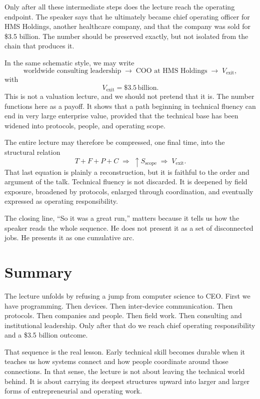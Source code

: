 Only after all these intermediate steps does the lecture reach the operating endpoint. The speaker says that he ultimately became chief operating officer for HMS Holdings, another healthcare company, and that the company was sold for \$3.5 billion. The number should be preserved exactly, but not isolated from the chain that produces it.

In the same schematic style, we may write
\begin{equation}
\text{worldwide consulting leadership}
\;\to\;
\text{COO at HMS Holdings}
\;\to\;
V_{\text{exit}},
\end{equation}
with
\begin{equation}
V_{\text{exit}} = \$3.5\,\text{billion}.
\end{equation}
This is not a valuation lecture, and we should not pretend that it is. The number functions here as a payoff. It shows that a path beginning in technical fluency can end in very large enterprise value, provided that the technical base has been widened into protocols, people, and operating scope.

The entire lecture may therefore be compressed, one final time, into the structural relation
\begin{equation}
T + F + P + C \;\Longrightarrow\; \uparrow S_{\text{scope}} \;\Longrightarrow\; V_{\text{exit}}.
\end{equation}
That last equation is plainly a reconstruction, but it is faithful to the order and argument of the talk. Technical fluency is not discarded. It is deepened by field exposure, broadened by protocols, enlarged through coordination, and eventually expressed as operating responsibility.

The closing line, ``So it was a great run,'' matters because it tells us how the speaker reads the whole sequence. He does not present it as a set of disconnected jobs. He presents it as one cumulative arc.

\section{Summary}

The lecture unfolds by refusing a jump from computer science to CEO. First we have programming. Then devices. Then inter-device communication. Then protocols. Then companies and people. Then field work. Then consulting and institutional leadership. Only after that do we reach chief operating responsibility and a \$3.5 billion outcome.

That sequence is the real lesson. Early technical skill becomes durable when it teaches us how systems connect and how people coordinate around those connections. In that sense, the lecture is not about leaving the technical world behind. It is about carrying its deepest structures upward into larger and larger forms of entrepreneurial and operating work.